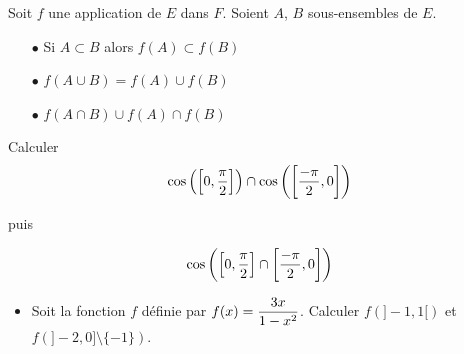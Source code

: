 \documentclass[a4paper, 11pt]{article}
\begin{document}
\begin{prop}
	Soit $f$ une application de $E$ dans $F$. Soient $A$, $B$ sous-ensembles de $E$.%

	\begin{minipage}{0.4\textwidth}
		\begin{itemize}
			\item[$\bullet$] Si $A\subset B$ alors  $f(A)\subset f(B)$
			\item[$\bullet$] $f(A\cup B)= f(A) \cup f(B)$
			\item[$\bullet$] $f(A\cap B)\cup f(A) \cap f(B)$
		\end{itemize}
	\end{minipage}

\end{prop}

\begin{exemples}
	Calculer
	$$ \displaystyle \cos{\left( \left\lbrack 0, \displaystyle\frac{\pi}{2}\right\rbrack \right)} \cap
		\cos{\left( \left\lbrack  \frac{-\pi}{2},0 \right\rbrack \right)}
	$$

	puis

	$$ \cos{\left( \left\lbrack 0,\displaystyle\frac{\pi}{2}\right\rbrack \cap
			\left\lbrack \frac{-\pi}{2},\displaystyle0 \right\rbrack \right)}
	$$
\end{exemples}



\begin{exemple}
	\begin{itemize}
		\item Soit la fonction $f$ d\'efinie par $f(x)=\displaystyle\frac{3x}{1-x^2}$. Calculer  $f(\rbrack -1,1\lbrack)$ et $f(\rbrack -2,0\rbrack\setminus\lbrace -1\rbrace)$.%


	\end{itemize}
\end{exemple}
\end{document}
